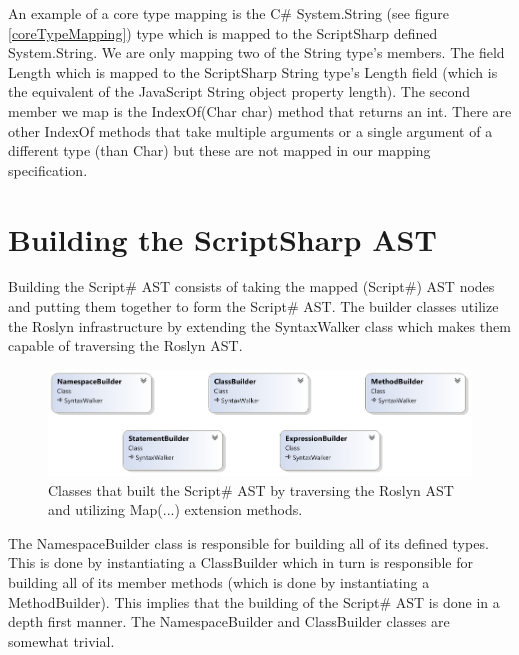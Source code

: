 		An example of a core type mapping is the C\# System.String (see figure \ref{coreTypeMapping}) type which is mapped to the ScriptSharp defined System.String. We are only mapping two of the String type’s members. The field Length which is mapped to the ScriptSharp String type’s Length field (which is the equivalent of the JavaScript String object property length). The second member we map is the IndexOf(Char char) method that returns an int. There are other IndexOf methods that take multiple arguments or a single argument of a different type (than Char) but these are not mapped in our mapping specification.

\section{Building the ScriptSharp AST} %
\label{sec:building_the_scriptsharp_ast}
	Building the Script\# AST consists of taking the mapped (Script\#) AST nodes and putting them together to form the Script\# AST. The builder classes utilize the Roslyn infrastructure by extending the SyntaxWalker class which makes them capable of traversing the Roslyn AST.
	\begin{figure}[H]
		\begin{center}
			\centerline{\includegraphics[width=16cm]{resources/images/BuilderClasses.png}}
		\end{center}
		\caption{Classes that built the Script\# AST by traversing the Roslyn AST and utilizing Map(...) extension methods.}
		\label{builderClasses}
	\end{figure}

	The NamespaceBuilder class is responsible for building all of its defined types. This is done by instantiating a ClassBuilder which in turn is responsible for building all of its member methods (which is done by instantiating a MethodBuilder). This implies that the building of the Script\# AST is done in a depth first manner. The NamespaceBuilder and ClassBuilder classes are somewhat trivial. 

